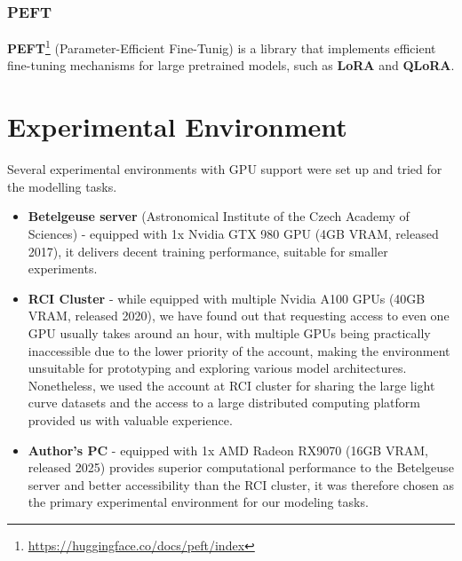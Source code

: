 \subsubsection{PEFT}

\textbf{PEFT}\footnote{\url{https://huggingface.co/docs/peft/index}} (Parameter-Efficient Fine-Tunig) is a library that implements efficient fine-tuning mechanisms for large pretrained models, such as \textbf{LoRA} and \textbf{QLoRA}.


\section{Experimental Environment}

Several experimental environments with GPU support were set up and tried for the modelling tasks.

\begin{itemize}
    \item \textbf{Betelgeuse server} (Astronomical Institute of the Czech Academy of Sciences) - equipped with 1x Nvidia GTX 980 GPU (4GB VRAM, released 2017), it delivers decent training performance, suitable for smaller experiments.
    \item \textbf{RCI Cluster} - while equipped with multiple Nvidia A100 GPUs (40GB VRAM, released 2020), we have found out that requesting access to even one GPU usually takes around an hour, with multiple GPUs being practically inaccessible due to the lower priority of the account, making the environment unsuitable for prototyping and exploring various model architectures.
    Nonetheless, we used the account at RCI cluster for sharing the large light curve datasets and the access to a large distributed computing platform provided us with valuable experience.
    \item \textbf{Author's PC} - equipped with 1x AMD Radeon RX9070 (16GB VRAM, released 2025) provides superior computational performance to the Betelgeuse server and better accessibility than the RCI cluster, it was therefore chosen as the primary experimental environment for our modeling tasks.
\end{itemize}



